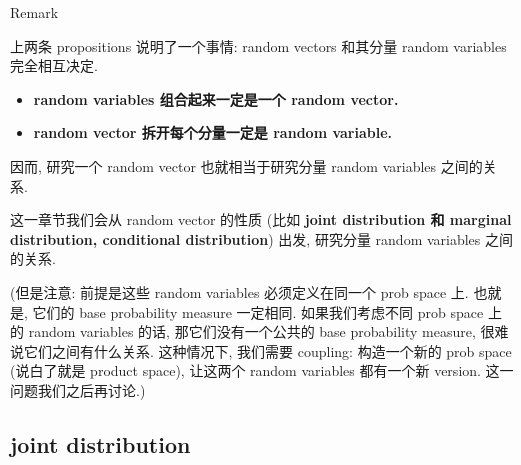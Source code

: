 \begin{qlremark}{Remark}

上两条 propositions 说明了一个事情: random vectors 和其分量 random variables 完全相互决定.

\begin{itemize}
\item
  \textbf{random variables 组合起来一定是一个 random vector.}
\item
  \textbf{random vector 拆开每个分量一定是 random variable.}
\end{itemize}

因而, 研究一个 random vector 也就相当于研究分量 random variables 之间的关系.

这一章节我们会从 random vector 的性质 (比如 \textbf{joint distribution 和 marginal distribution, conditional distribution}) 出发, 研究分量 random variables 之间的关系.

(但是注意: 前提是这些 random variables 必须定义在同一个 prob space 上. 也就是, 它们的 base probability measure 一定相同. 如果我们考虑不同 prob space 上的 random variables 的话, 那它们没有一个公共的 base probability measure, 很难说它们之间有什么关系. 这种情况下, 我们需要 coupling: 构造一个新的 prob space (说白了就是 product space), 让这两个 random variables 都有一个新 version. 这一问题我们之后再讨论.)

\end{qlremark}

\subsection{joint distribution}\label{joint-distribution}


